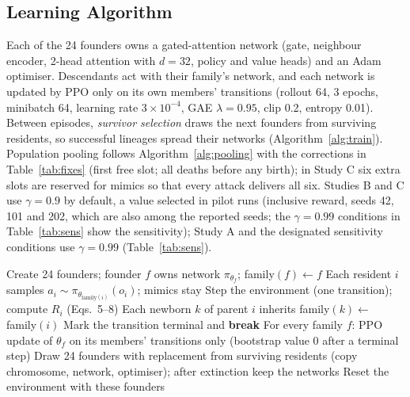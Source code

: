 \documentclass{article}
\begin{document}
\subsection{Learning Algorithm}
Each of the 24 founders owns a gated-attention network (gate, neighbour encoder, 2-head attention with $d=32$, policy and value heads) and an Adam optimiser. Descendants act with their family's network, and each network is updated by PPO \cite{schulman2017} only on its own members' transitions (rollout 64, 3 epochs, minibatch 64, learning rate $3\times10^{-4}$, GAE $\lambda=0.95$, clip 0.2, entropy 0.01). Between episodes, \emph{survivor selection} draws the next founders from surviving residents, so successful lineages spread their networks (Algorithm~\ref{alg:train}). Population pooling follows Algorithm~\ref{alg:pooling} with the corrections in Table~\ref{tab:fixes} (first free slot; all deaths before any birth); in Study C six extra slots are reserved for mimics so that every attack delivers all six. Studies B and C use $\gamma=0.9$ by default, a value selected in pilot runs (inclusive reward, seeds 42, 101 and 202, which are also among the reported seeds; the $\gamma=0.99$ conditions in Table~\ref{tab:sens} show the sensitivity); Study A and the designated sensitivity conditions use $\gamma=0.99$ (Table~\ref{tab:sens}).

\begin{algorithm}[!htbp]
\caption{Per-family PPO with inheritance and survivor selection}
\label{alg:train}
\begin{algorithmic}[1]
\STATE Create 24 founders; founder $f$ owns network $\pi_{\theta_f}$; family$(f) \leftarrow f$
        \STATE Each resident $i$ samples $a_i \sim \pi_{\theta_{\mathrm{family}(i)}}(o_i)$; mimics stay
        \STATE Step the environment (one transition); compute $R_i$ (Eqs.~5--8)
        \STATE Each newborn $k$ of parent $i$ inherits family$(k) \leftarrow$ family$(i)$
            \STATE Mark the transition terminal and \textbf{break}
        \ENDIF
    \ENDFOR
    \STATE For every family $f$: PPO update of $\theta_f$ on its members' transitions only (bootstrap value 0 after a terminal step)
        \STATE Draw 24 founders with replacement from surviving residents (copy chromosome, network, optimiser); after extinction keep the networks
        \STATE Reset the environment with these founders
    \ENDIF
\ENDWHILE
\end{algorithmic}
\end{algorithm}
\end{document}
